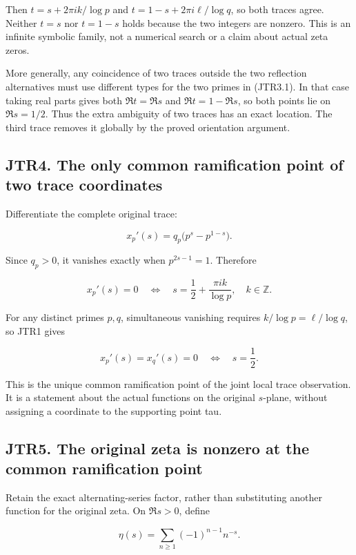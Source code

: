\documentclass[
]{article}
\begin{document}
Then \(t=s+2\pi i k/\log p\) and \(t=1-s+2\pi i\ell/\log q\), so both
traces agree. Neither \(t=s\) nor \(t=1-s\) holds because the two
integers are nonzero. This is an infinite symbolic family, not a
numerical search or a claim about actual zeta zeros.

More generally, any coincidence of two traces outside the two reflection
alternatives must use different types for the two primes in (JTR3.1). In
that case taking real parts gives both \(\Re t=\Re s\) and
\(\Re t=1-\Re s\), so both points lie on \(\Re s=1/2\). Thus the extra
ambiguity of two traces has an exact location. The third trace removes
it globally by the proved orientation argument.

\subsection{JTR4. The only common ramification point of two trace
coordinates}\label{jtr4.-the-only-common-ramification-point-of-two-trace-coordinates}

Differentiate the complete original trace:

\[
x_p'(s)=q_p\bigl(p^s-p^{1-s}\bigr).
\tag{JTR4.1}
\]

Since \(q_p>0\), it vanishes exactly when \(p^{2s-1}=1\). Therefore

\[
x_p'(s)=0
\quad\Longleftrightarrow\quad
s=\frac12+\frac{\pi i k}{\log p},\quad k\in\mathbb Z.
\tag{JTR4.2}
\]

For any distinct primes \(p,q\), simultaneous vanishing requires
\(k/\log p=\ell/\log q\), so JTR1 gives

\[
\boxed{x_p'(s)=x_q'(s)=0\quad\Longleftrightarrow\quad s=\frac12.}
\tag{JTR4.3}
\]

This is the unique common ramification point of the joint local trace
observation. It is a statement about the actual functions on the
original \(s\)-plane, without assigning a coordinate to the supporting
point tau.

\subsection{JTR5. The original zeta is nonzero at the common
ramification
point}\label{jtr5.-the-original-zeta-is-nonzero-at-the-common-ramification-point}

Retain the exact alternating-series factor, rather than substituting
another function for the original zeta. On \(\Re s>0\), define

\[
\eta(s)=\sum_{n\ge1}(-1)^{n-1}n^{-s}.
\tag{JTR5.1}
\]
\end{document}
